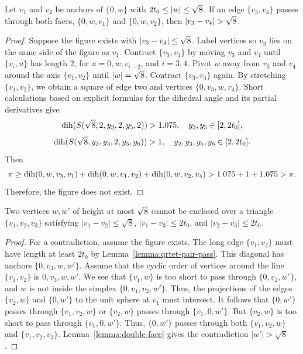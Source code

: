 \begin{lemma} \label{lemma:double-face}
Let $v_1$ and $v_2$ be anchors of $\{0,w\}$ with $2t_0\le |w|\le
\sqrt8$. If an edge $\{v_3,v_4\}$ passes through both faces,
$\{0,w,v_1\}$ and $\{0,w,v_2\}$, then $|v_3-v_4|>\sqr8$.
\end{lemma}

\begin{proof}
Suppose the figure exists with $|v_3-v_4|\le\sqrt8$. Label vertices
so $v_3$ lies on the same side of the figure as $v_1$. Contract
$\{v_3,v_4\}$ by moving $v_3$ and $v_4$ until
    $\{v_i,u\}$ has length $2$,
for $u=0,w,v_{i-2}$, and $i=3,4$. Pivot $w$ away from $v_3$ and
$v_4$ around the axis $\{v_1,v_2\}$ until
    $|w|=\sqrt8$.
Contract $\{v_3,v_4\}$ again. By stretching $\{v_1,v_2\}$, we
obtain a square of edge two and vertices $\{0,v_3,w,v_4\}$. Short
calculations based on explicit formulas for the dihedral angle and
its partial derivatives give
    \begin{equation}
        \operatorname{dih}(S(\sqrt8,2,y_3,2,y_5,2)) > 1.075,\quad
        y_3,y_5\in[2,2t_0],\label{eqn:1.7.1}
    \end{equation}
    \begin{equation}
    \operatorname{dih}(S(\sqrt8,y_2,y_3,2,y_5,y_6)) >1,\quad
        y_2,y_3,y_5,y_6\in[2,2t_0].
        \label{eqn:1.7.2}
    \end{equation}
Then
$$\pi\ge \operatorname{dih}(0,w,v_3,v_1) + \operatorname{dih}(0,w,v_1,v_2) + \operatorname{dih}(0,w,v_2,v_4)
    > 1.075 + 1 + 1.075 > \pi.$$
Therefore, the figure does not exist.
\end{proof}

\begin{lemma} \label{lemma:single-enclosed}
Two vertices $w,w'$ of height at most $\sqrt8$ cannot be enclosed
over a triangle $\{v_1,v_2,v_3\}$ satisfying $|v_1-v_2|\le\sqrt8$,
$|v_1-v_3|\le 2t_0$, and $|v_2-v_3|\le 2t_0$.
\end{lemma}

\begin{proof}
For a contradiction, assume the figure exists. The long edge
$\{v_1,v_2\}$ must have length at least $2t_0$ by
Lemma~\ref{lemma:qrtet-pair-pass}. This diagonal has anchors
$\{0,v_3,w,w'\}$. Assume that the cyclic order of vertices around
the line $\{v_1,v_2\}$ is $0,v_3,w,w'$. We see that $\{v_1,w\}$ is
too short to pass through $\{0,v_2,w'\}$, and $w$ is not inside
the simplex $\{0,v_1,v_2,w'\}$.  Thus, the projections of the
edges $\{v_2,w\}$ and $\{0,w'\}$ to the unit sphere at $v_1$ must
intersect.  It follows that $\{0,w'\}$ passes through
$\{v_1,v_2,w\}$ or $\{v_2,w\}$ passes through $\{v_1,0,w'\}$.  But
$\{v_2,w\}$ is too short to pass through $\{v_1,0,w'\}$.  Thus,
$\{0,w'\}$ passes through both $\{v_1,v_2,w\}$ and
$\{v_1,v_2,v_3\}$. Lemma~\ref{lemma:double-face} gives the
contradiction $|w'|>\sqrt8$.
\end{proof}

